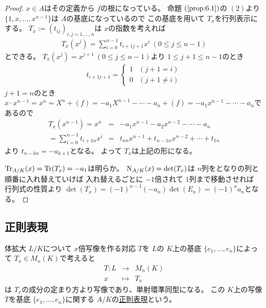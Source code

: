 \documentclass[../master_galois_theory]{subfiles}
\begin{document}
\begin{proof}
  $x \in A$はその定義から $f$の根になっている。
  命題 $(\mathrm{\ref{prop:6.1}})$の $(2)$より
  $\{ 1 , x , \dots , x^{n-1} \}$は $A$の基底になっているので
  この基底を用いて $T_x$を行列表示にする。
  $T_x := (t_{ij})_{i,j = 1 , \dots , n}$は $x$の指数を考えれば
  \begin{eqnarray*}
    T_x(x^j) = \sum_{i=0}^{n-1} t_{i+1 j+1} x^i \  (0 \leq j \leq n-1)
  \end{eqnarray*}
  とできる。
  $T_x(x^j) = x^{j+1} \  (0 \leq j \leq n-1)$より $1 \leq j+1 \leq n-1$のとき
  \begin{eqnarray*}
    t_{i+1 j+1} =
    \begin{cases}
      1 & (j+1 = i) \\
      0 & (j+1 \neq i)
    \end{cases}
  \end{eqnarray*}
  $j+1 = n$のとき $x \cdot x^{n-1} = x^n = X^n + (f) = -a_1 X^{n-1} - \cdots -a_n + (f) = -a_1 x^{n-1} - \cdots -a_n$であるので
  \begin{eqnarray*}
    T_x(x^{n-1}) = x^n & = & -a_1 x^{n-1} -a_2 x^{n-2} - \cdots -a_n \\
    = \sum_{i=0}^{n-1} t_{i+1 n} x^i & = & t_{n n} x^{n-1} + t_{n-1 n} x^{n-2} + \cdots + t_{1 n}
  \end{eqnarray*}
  より $t_{n-k n} = -a_{k+1}$となる。
  よって $T_x$は上記の形になる。

  $\mathrm{Tr}_{A/K}(x) = \mathrm{Tr}(T_x) = -a_1$は明らか。
  $\mathrm{N}_{A/K}(x) = \det(T_x)$は $n$列をとなりの列と順番に入れ替えていけば
  入れ替えるごとに $-1$倍されて $1$列まで移動させれば
  行列式の性質より $\det(T_x) = (-1)^{n-1} (-a_n) \det(E_n) = (-1)^n a_n$となる。
\end{proof}

\subsection{正則表現}

\begin{prop}
  体拡大 $L/K$について
  $x$倍写像を作る対応 $T$を $L$の $K$上の基底 $\{ e_1 , \dots , e_n \}$によって $T_x \in M_n(K)$で考えると
  \begin{eqnarray*}
    T : L & \longrightarrow & M_n(K) \\
    x & \longmapsto & T_x
  \end{eqnarray*}
  は $T_x$の成分の定まり方より写像であり、単射環準同型になる。
  この $K$上の写像 $T$を基底 $\{ e_1 , \dots , e_n \}$に関する
  $A/K$の\underline{正則表現}という。
\end{prop}
\end{document}
